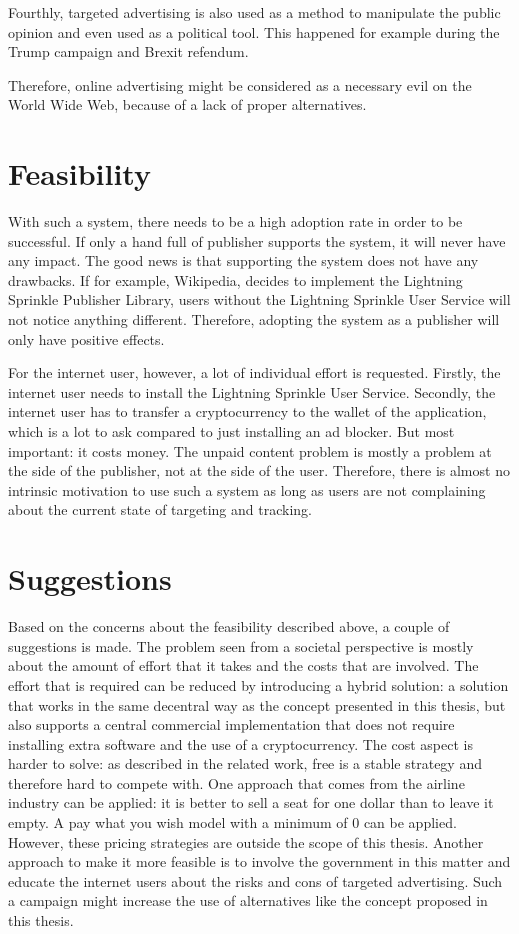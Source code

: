 Fourthly, targeted advertising is also used as a method to manipulate the public opinion and even used as a political tool. This happened for example during the Trump campaign and Brexit refendum\cite{cadwalladr2018cambridge}.

Therefore, online advertising might be considered as a necessary evil on the World Wide Web, because of a lack of proper alternatives.

\section{Feasibility}
With such a system, there needs to be a high adoption rate in order to be successful. If only a hand full of publisher supports the system, it will never have any impact. The good news is that supporting the system does not have any drawbacks. If for example, Wikipedia, decides to implement the Lightning Sprinkle Publisher Library, users without the Lightning Sprinkle User Service will not notice anything different. Therefore, adopting the system as a publisher will only have positive effects.

For the internet user, however, a lot of individual effort is requested. Firstly, the internet user needs to install the Lightning Sprinkle User Service. Secondly, the internet user has to transfer a cryptocurrency to the wallet of the application, which is a lot to ask compared to just installing an ad blocker. 
But most important: it costs money. The unpaid content problem is mostly a problem at the side of the publisher, not at the side of the user. Therefore, there is almost no intrinsic motivation to use such a system as long as users are not complaining about the current state of targeting and tracking. 

\section{Suggestions}
Based on the concerns about the feasibility described above, a couple of suggestions is made. The problem seen from a societal perspective is mostly about the amount of effort that it takes and the costs that are involved. The effort that is required can be reduced by introducing a hybrid solution: a solution that works in the same decentral way as the concept presented in this thesis, but also supports a central commercial implementation that does not require installing extra software and the use of a cryptocurrency. The cost aspect is harder to solve: as described in the related work, free is a stable strategy and therefore hard to compete with. One approach that comes from the airline industry can be applied: it is better to sell a seat for one dollar than to leave it empty. A pay what you wish model with a minimum of 0 can be applied. However, these pricing strategies are outside the scope of this thesis. Another approach to make it more feasible is to involve the government in this matter and educate the internet users about the risks and cons of targeted advertising. Such a campaign might increase the use of alternatives like the concept proposed in this thesis.


